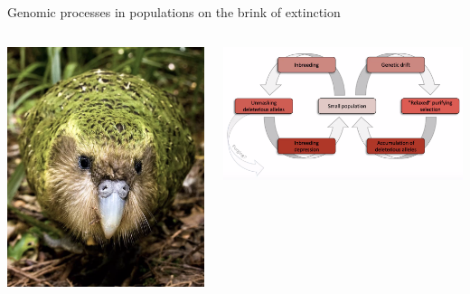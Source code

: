 \documentclass[10pt]{beamer}
\begin{document}
\begin{frame}{Genomic processes in populations on the brink of extinction}
\begin{columns}
	\begin{column}{0.3\textwidth}
		\begin{center}
			\includegraphics[width=\textwidth,trim=30 100 30 0,clip]{./figures/kakapo.png}
	\end{center}\end{column}
	\begin{column}{0.7\textwidth}
		\begin{center}
			\includegraphics[width=\textwidth]{./figures/small_populations.png}

\end{center}
\end{column}
\end{columns}
\end{frame}
\end{document}

